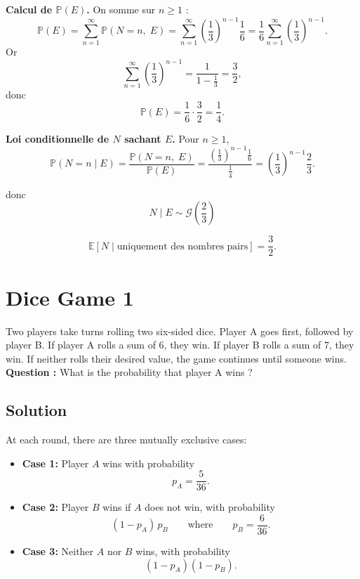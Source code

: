 \medskip
\textbf{Calcul de $\mathbb{P}(E)$.}
On somme sur $n\ge 1$ :
\[
\mathbb{P}(E)=\sum_{n=1}^{\infty}\mathbb{P}(N=n,\;E)
=\sum_{n=1}^{\infty}\left(\frac{1}{3}\right)^{n-1}\frac{1}{6}
=\frac{1}{6}\sum_{n=1}^{\infty}\left(\frac{1}{3}\right)^{n-1}.
\]
Or
\[
\sum_{n=1}^{\infty}\left(\frac{1}{3}\right)^{n-1}
=\frac{1}{1-\frac{1}{3}}=\frac{3}{2},
\]
donc
\[
\mathbb{P}(E)=\frac{1}{6}\cdot\frac{3}{2}=\frac{1}{4}.
\]

\medskip
\textbf{Loi conditionnelle de $N$ sachant $E$.}
Pour $n\ge 1$,
\[
\mathbb{P}(N=n\mid E)
=\frac{\mathbb{P}(N=n,\;E)}{\mathbb{P}(E)}
=\frac{\left(\frac{1}{3}\right)^{n-1}\frac{1}{6}}{\frac{1}{4}}
= \left(\frac{1}{3}\right)^{n-1}\frac23.
\]

donc 
\[
N \mid E \sim \mathcal{G}\!\left(\frac{2}{3}\right)
\]

\[
\boxed{\mathbb{E}[N\mid \text{uniquement des nombres pairs}] = \frac{3}{2}.}
\]


\section{Dice Game 1}

\begin{exerciseBox}
Two players take turns rolling two six-sided dice. 
Player A goes first, followed by player B. 
If player A rolls a sum of 6, they win. 
If player B rolls a sum of 7, they win. 
If neither rolls their desired value, 
the game continues until someone wins. \\

\textbf{Question :} What is the probability that player A wins ?
\end{exerciseBox}

\subsection*{Solution}

At each round, there are three mutually exclusive cases:

\begin{itemize}
  \item \textbf{Case 1:} Player $A$ wins with probability
  \[
    p_A=\frac{5}{36}.
  \]
  \item \textbf{Case 2:} Player $B$ wins if $A$ does not win, with probability
  \[
    (1-p_A)\,p_B
    \qquad\text{where}\qquad
    p_B=\frac{6}{36}.
  \]
  \item \textbf{Case 3:} Neither $A$ nor $B$ wins, with probability
  \[
    (1-p_A)(1-p_B).
  \]
\end{itemize}

